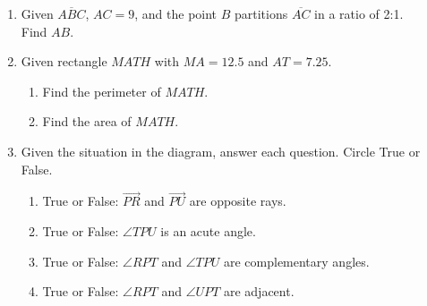 \documentclass[12pt, oneside]{article}
\begin{document}
\begin{enumerate}
  \item Given $\overline{ABC}$, $AC=9$, and the point $B$ partitions $\overline{AC}$ in a ratio of 2:1.\\[0.5cm] Find ${AB}$. \\[0.5cm]
       \vspace{3cm}

  \item Given rectangle $MATH$ with $MA=12.5$ and $AT=7.25$.
    \begin{enumerate}
      \item Find the perimeter of $MATH$. \vspace{2cm}
      \item Find the area of $MATH$.
    \end{enumerate}

\newpage
  \item Given the situation in the diagram, answer each question. Circle True or False. \vspace{1cm}
      \begin{flushright}
      \end{flushright}
    \begin{enumerate}
      \item True or False: $\overrightarrow{PR}$ and $\overrightarrow{PU}$ are opposite rays.\bigskip
      \item True or False: $\angle TPU$ is an acute angle.\bigskip
      \item True or False: $\angle RPT$ and $\angle TPU$ are complementary angles.\bigskip
      \item True or False: $\angle RPT$ and $\angle UPT$ are adjacent. \bigskip
    \end{enumerate}


\end{enumerate}
\end{document}

